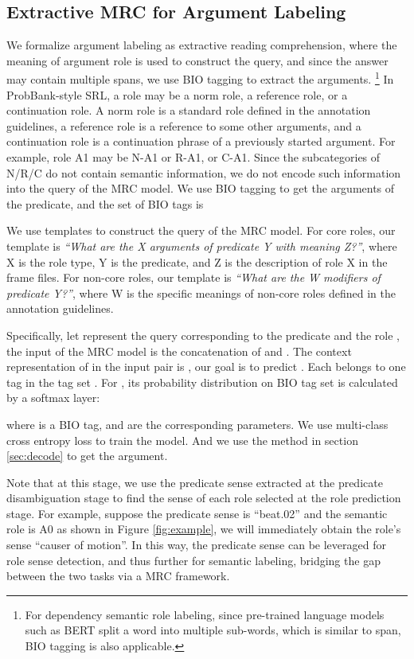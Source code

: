\documentclass[11pt]{article}
\begin{document}
\subsection{Extractive MRC for Argument Labeling}
\label{sec:labeling}
We formalize argument labeling as extractive reading comprehension, where the meaning of argument role is used to construct the query, and since the answer may contain multiple spans, we use BIO tagging to extract the arguments. 
\footnote{For dependency semantic role labeling, since pre-trained language models such as BERT split a word into multiple sub-words, which is similar to span, BIO tagging is also applicable.}
In ProbBank-style SRL, a role may be a norm role, a reference role, or a continuation role. A norm role is a standard role defined in the annotation guidelines, a reference role is a reference to some other arguments, and a continuation role is a continuation phrase of a previously started argument. For example, role A1 may be N-A1 or R-A1, or C-A1. Since the subcategories of N/R/C do not contain semantic information, we do not encode such information into the query of the MRC model. We use BIO tagging to get the arguments of the predicate, and the set of BIO tags is

We use templates to construct the query of the MRC model. For core roles, our template is \textit{``What are the X arguments of predicate Y with meaning Z?''}, where X is the role type, Y is the predicate, and Z is the description of role X in the frame files.
For non-core roles, our template is \textit{``What are the W modifiers of predicate Y?''}, where W is the specific meanings of non-core roles defined in the annotation guidelines.
\par
Specifically, let  represent the query corresponding to the predicate  and the role  , the input of the MRC model is the concatenation of  and . The context representation of  in the input  pair is , our goal is to predict . Each  belongs to one tag in the tag set . For  , its probability distribution on BIO tag set is calculated by a softmax layer:

where  is a BIO tag,  and  are the corresponding parameters. We use multi-class cross entropy loss to train the model. And we use the method in section \ref{sec:decode} to get the argument.
\par
Note that at this stage, we use the predicate sense extracted at the predicate disambiguation stage to find the sense of each role selected at the role prediction stage. 
For example, suppose the predicate sense is ``beat.02'' and the semantic role is A0 as shown in Figure \ref{fig:example}, we will immediately obtain the role's sense ``causer of motion''.
In this way, the predicate sense can be leveraged for role sense detection, and thus further for semantic labeling, bridging the gap between the two tasks via a MRC framework.
\end{document}
